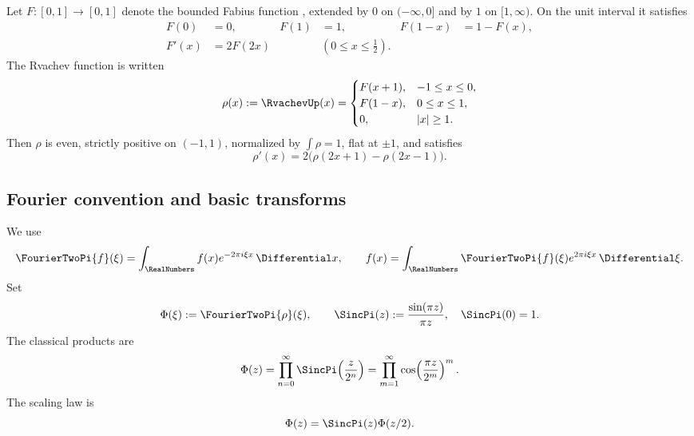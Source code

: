 \documentclass[11pt]{article}
\theoremstyle{definition}
\theoremstyle{remark}
\begin{document}
Let \(F:[0,1]\to[0,1]\) denote the bounded Fabius function \cite{p1:Fabius1966,p1:AriasTranslation}, extended by \(0\) on
\(( -\infty,0]\) and by \(1\) on \([1,\infty)\).  On the unit interval it satisfies
\begin{align}
 F(0)&=0, & F(1)&=1, & F(1-x)&=1-F(x), \label{p1:eq:F-symmetry}\\
 F'(x)&=2F(2x) &&(0\le x\le\tfrac12). \label{p1:eq:F-diff}
\end{align}
The Rvachev function is written
\begin{equation}
 \rho(x):=\RvachevUp(x)=
 \begin{cases}
 F(x+1),&-1\le x\le0,\\
 F(1-x),&0\le x\le1,\\
 0,&|x|\ge1.
 \end{cases}                                                \label{p1:eq:rho-fold}
\end{equation}
Then \(\rho\) is even, strictly positive on \((-1,1)\), normalized by
\(\int\rho=1\), flat at \(\pm1\), and satisfies
\begin{equation}
 \rho'(x)=2\bigl(\rho(2x+1)-\rho(2x-1)\bigr).                \label{p1:eq:rho-dde}
\end{equation}

\subsection{Fourier convention and basic transforms}

We use
\begin{equation}
 \FourierTwoPi{f}(\xi)=\int_{\RealNumbers}f(x)e^{-2\pi i\xi x}\,\Differential x,
 \qquad
 f(x)=\int_{\RealNumbers}\FourierTwoPi{f}(\xi)e^{2\pi i\xi x}\,\Differential\xi.       \label{p1:eq:fourier-convention}
\end{equation}
Set
\begin{equation}
 \Phi(\xi):=\FourierTwoPi{\rho}(\xi),
 \qquad
 \SincPi(z):=\frac{\sin(\pi z)}{\pi z},\quad \SincPi(0)=1. \label{p1:eq:Phi-def}
\end{equation}
The classical products are
\begin{equation}
 \Phi(z)=\prod_{n=0}^{\infty}\SincPi\!\left(\frac{z}{2^n}\right)
 =\prod_{m=1}^{\infty}\cos\!\left(\frac{\pi z}{2^m}\right)^m. \label{p1:eq:Phi-products}
\end{equation}
The scaling law is
\begin{equation}
 \Phi(z)=\SincPi(z)\Phi(z/2).                                \label{p1:eq:Phi-scaling}
\end{equation}
\end{document}
